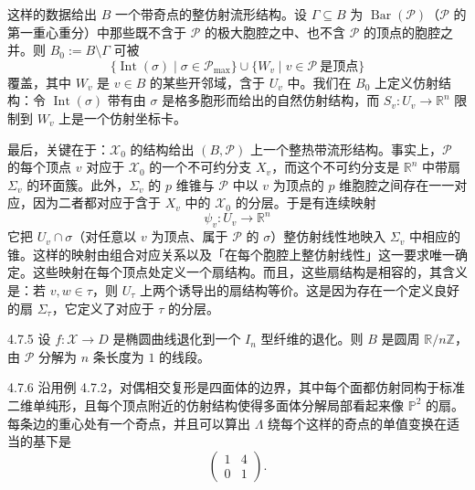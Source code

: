 这样的数据给出 $B$ 一个带奇点的整仿射流形结构。设 $\Gamma\subseteq B$ 为 $\operatorname{Bar}(\mathcal{P})$（$\mathcal{P}$ 的第一重心重分）中那些既不含于 $\mathcal{P}$ 的极大胞腔之中、也不含 $\mathcal{P}$ 的顶点的胞腔之并。则 $B_0:=B\setminus\Gamma$ 可被
\[
\{\operatorname{Int}(\sigma)\mid \sigma\in\mathcal{P}_{\max}\}\cup\{W_v\mid v\in\mathcal{P}\ \text{是顶点}\}
\]
覆盖，其中 $W_v$ 是 $v\in B$ 的某些开邻域，含于 $U_v$ 中。我们在 $B_0$ 上定义仿射结构：令 $\operatorname{Int}(\sigma)$ 带有由 $\sigma$ 是格多胞形而给出的自然仿射结构，而 $S_v:U_v\to\mathbb{R}^n$ 限制到 $W_v$ 上是一个仿射坐标卡。

最后，关键在于：$\mathcal{X}_0$ 的结构给出 $(B,\mathcal{P})$ 上一个整热带流形结构。事实上，$\mathcal{P}$ 的每个顶点 $v$ 对应于 $\mathcal{X}_0$ 的一个不可约分支 $X_v$，而这个不可约分支是 $\mathbb{R}^n$ 中带扇 $\Sigma_v$ 的环面簇。此外，$\Sigma_v$ 的 $p$ 维锥与 $\mathcal{P}$ 中以 $v$ 为顶点的 $p$ 维胞腔之间存在一一对应，因为二者都对应于含于 $X_v$ 中的 $\mathcal{X}_0$ 的分层。于是有连续映射
\[
\psi_v:U_v\to\mathbb{R}^n
\]
它把 $U_v\cap\sigma$（对任意以 $v$ 为顶点、属于 $\mathcal{P}$ 的 $\sigma$）整仿射线性地映入 $\Sigma_v$ 中相应的锥。这样的映射由组合对应关系以及「在每个胞腔上整仿射线性」这一要求唯一确定。这些映射在每个顶点处定义一个扇结构。而且，这些扇结构是相容的，其含义是：若 $v,w\in\tau$，则 $U_\tau$ 上两个诱导出的扇结构等价。这是因为存在一个定义良好的扇 $\Sigma_\tau$，它定义了对应于 $\tau$ 的分层。

\begin{example}{4.7.5}
设 $f:\mathcal{X}\to D$ 是椭圆曲线退化到一个 $I_n$ 型纤维的退化。则 $B$ 是圆周 $\mathbb{R}/n\mathbb{Z}$，由 $\mathcal{P}$ 分解为 $n$ 条长度为 $1$ 的线段。
\end{example}

\begin{example}{4.7.6}
沿用例 4.7.2，对偶相交复形是四面体的边界，其中每个面都仿射同构于标准二维单纯形，且每个顶点附近的仿射结构使得多面体分解局部看起来像 $\mathbb{P}^2$ 的扇。每条边的重心处有一个奇点，并且可以算出 $\Lambda$ 绕每个这样的奇点的单值变换在适当的基下是
\[
\begin{pmatrix} 1 & 4 \\ 0 & 1 \end{pmatrix}.
\]
\end{example}


